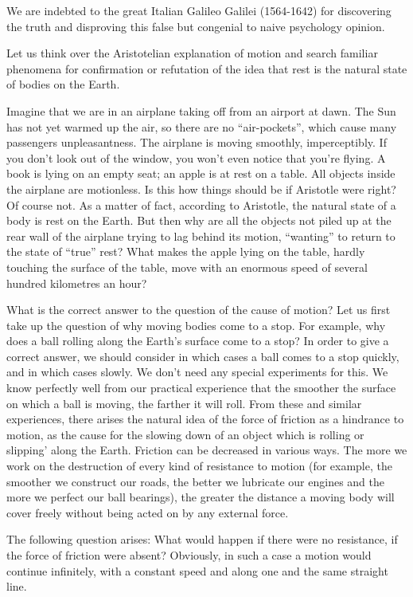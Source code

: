 We are indebted to the great Italian Galileo Galilei
(1564-1642) for discovering the truth and disproving
this false but congenial to naive psychology opinion.

Let us think over the Aristotelian explanation of
motion and search familiar phenomena for confirmation
or refutation of the idea that rest is the natural state
of bodies on the Earth.

Imagine that we are in an airplane taking off from an
airport at dawn. The Sun has not yet warmed up the air,
so there are no ``air-pockets'', which cause many passengers unpleasantness. The airplane is moving smoothly,
imperceptibly. If you don't look out of the window, you
won't even notice that you're flying. A book is lying on
an empty seat; an apple is at rest on a table. All objects
inside the airplane are motionless. Is this how things
should be if Aristotle were right? Of course not. As a
matter of fact, according to Aristotle, the natural state
of a body is rest on the Earth. But then why are all the
objects not piled up at the rear wall of the airplane
trying to lag behind its motion, ``wanting'' to return to
the state of ``true'' rest? What makes the apple lying on
the table, hardly touching the surface of the table, move
with an enormous speed of several hundred kilometres
an hour?

What is the correct answer to the question of the
cause of motion? Let us first take up the question of why
moving bodies come to a stop. For example, why does
a ball rolling along the Earth's surface come to a stop?
In order to give a correct answer, we should consider
in which cases a ball comes to a stop quickly, and in
which cases slowly. We don't need any special experiments for this. We know perfectly well from our practical
experience that the smoother the surface on which a ball
is moving, the farther it will roll. From these and similar
experiences, there arises the natural idea of the force
of friction as a hindrance to motion, as the cause for the
slowing down of an object which is rolling or slipping'
along the Earth. Friction can be decreased in various
ways. The more we work on the destruction of every
kind of resistance to motion (for example, the smoother
we construct our roads, the better we lubricate our engines
and the more we perfect our ball bearings), the greater
the distance a moving body will cover freely without
being acted on by any external force.

The following question arises: What would happen if
there were no resistance, if the force of friction were
absent? Obviously, in such a case a motion would continue
infinitely, with a constant speed and along one and the
same straight line.

